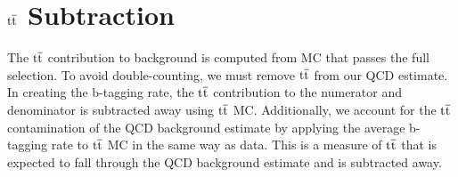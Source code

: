 \section{$\mathrm{t\overline{t}}$ Subtraction}
\label{sec:ttSubtraction}
\label{sec:bsttSubtraction}
The $\mathrm{t\overline{t}}$ contribution to background is computed from MC that passes the full selection. To avoid double-counting, we must remove $\mathrm{t\overline{t}}$ from our QCD estimate. 
In creating the b-tagging rate, the $\mathrm{t\overline{t}}$ contribution to the numerator and denominator is subtracted away using $\mathrm{t\overline{t}}$ MC. 
Additionally, we account for the $\mathrm{t\overline{t}}$ contamination of the QCD background estimate by applying 
the average b-tagging rate to $\mathrm{t\overline{t}}$ MC in the same way as data.  This is a measure of $\mathrm{t\overline{t}}$ that is expected to fall 
through the QCD background estimate and is subtracted away. 


